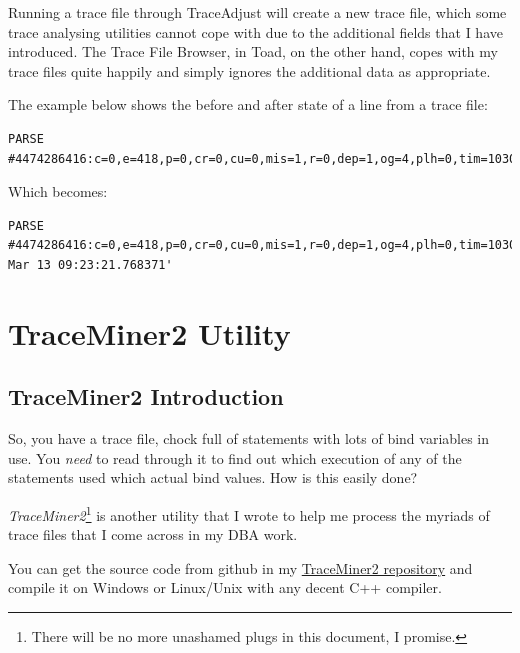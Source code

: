 \begin{appendix}
Running a trace file through TraceAdjust will create a new trace file,
which some trace analysing utilities cannot cope with due to the
additional fields that I have introduced. The Trace File Browser, in
Toad, on the other hand, copes with my trace files quite happily and
simply ignores the additional data as appropriate.

The example below shows the before and after state of a  line from a trace file:


\begin{lstlisting}[numbers=none,caption={TraceAdjust Example - Before Processing}]
PARSE #4474286416:c=0,e=418,p=0,cr=0,cu=0,mis=1,r=0,dep=1,og=4,plh=0,tim=1030574627220
\end{lstlisting}

Which becomes:

\begin{lstlisting}[numbers=none,caption={TraceAdjust Example - After Processing}]
PARSE #4474286416:c=0,e=418,p=0,cr=0,cu=0,mis=1,r=0,dep=1,og=4,plh=0,tim=1030574.627220,delta=-1,dslt=768371,local='2017 Mar 13 09:23:21.768371'
\end{lstlisting}

\chapter{TraceMiner2 Utility}
\label{traceminer2-utility}

\section*{TraceMiner2 Introduction}\label{traceminer2-introduction}

So, you have a trace file, chock full of statements with lots of bind
variables in use. You \emph{need} to read through it to find out which
execution of any of the statements used which actual bind values. How is
this easily done?

\emph{TraceMiner2}\footnote{There will be no more unashamed plugs in this
  document, I promise.} is another utility that I wrote to help me
process the myriads of trace files that I come across in my DBA work.

You can get the source code from github in my 
\href{https://github.com/NormanDunbar/TraceMiner2}{TraceMiner2 repository} and compile it
on Windows or Linux/Unix with any decent C++ compiler.


\end{appendix}
